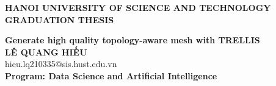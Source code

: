 \documentclass[DoAn.tex]{subfiles}
\begin{document}
\begin{titlepage}
\thispagestyle{empty}
\begin{center}

{\textbf{\large{HANOI UNIVERSITY OF SCIENCE AND TECHNOLOGY}}}\\[4cm]

{\textbf{\huge{GRADUATION THESIS}}}\\[1cm]
{\textbf{\Large{Generate high quality topology-aware mesh with TRELLIS}}\\[1cm]

{\textbf{\large{LÊ QUANG HIẾU}}}\\
{\large{hieu.lq210335@sis.hust.edu.vn}}\\[0.5cm]

{\textbf{\large{Program: Data Science and Artificial Intelligence
}}}\\

\vspace{4cm}
\begin{table}[H]
\centering
{}
\end{table}}
\end{center}



\end{titlepage}
\end{document}

